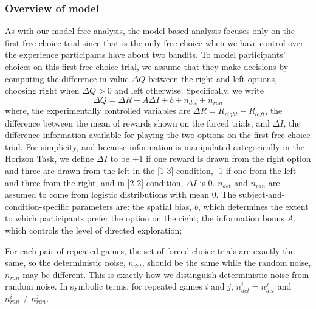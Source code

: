 \documentclass[12pt]{article}
\begin{document}
	\subsubsection*{Overview of model}
	As with our model-free analysis, the model-based analysis focuses only on the first free-choice trial since that is the only free choice when we have control over the experience participants have about two bandits. To model participants' choices on this first free-choice trial, we assume that they make decisions by computing the difference in value $\Delta Q$ between the right and left options, choosing right when $\Delta Q > 0$ and left otherwise.  Specifically, we write
	\begin{equation}
		\Delta Q= \Delta R+A \Delta I+b+n_{det}+n_{ran}
	\end{equation}
	where, the experimentally controlled variables are $\Delta R=R_{right}-R_{left}$, the difference between the mean of rewards shown on the forced trials, and $\Delta I$, the difference  information available for playing the two options on the first free-choice trial. For simplicity, and because information is manipulated categorically in the Horizon Task, we define $\Delta I$ to be +1 if one reward is drawn from the right option and three are drawn from the left in the [1 3] condition, -1 if one from the left and three from the right, and in [2 2] condition, $\Delta I$ is 0.  $n_{det}$ and $n_{ran}$ are assumed to come from logistic distributions with mean 0. The subject-and-condition-specific parameters are: the spatial bias, $b$, which determines the extent to which participants prefer the option on the right; the information bonus $A$, which controls the level of directed exploration; 
	
	For each pair of repeated games, the set of forced-choice trials are exactly the same, so the deterministic noise, $n_{det}$, should be the same while the random noise, $n_{ran}$ may be different. This is exactly how we distinguish deterministic noise from random noise. In symbolic terms, for repeated games $i$ and $j$,  $n_{det}^i=n_{det}^j$  and $n_{ran}^i \neq n_{ran}^j$.
	
\end{document}
